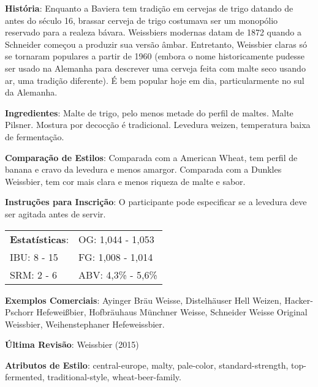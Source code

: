 \textbf{História}: Enquanto a Baviera tem tradição em cervejas de trigo datando de antes do século 16, brassar cerveja de trigo costumava ser um monopólio reservado para a realeza bávara. Weissbiers modernas datam de 1872 quando a Schneider começou a produzir sua versão âmbar. Entretanto, Weissbier claras só se tornaram populares a partir de 1960 (embora o nome historicamente pudesse ser usado na Alemanha para descrever uma cerveja feita com malte seco usando ar, uma tradição diferente). É bem popular hoje em dia, particularmente no sul da Alemanha.

\textbf{Ingredientes}: Malte de trigo, pelo menos metade do perfil de maltes. Malte Pilsner. Mostura por decocção é tradicional. Levedura weizen, temperatura baixa de fermentação.

\textbf{Comparação de Estilos}: Comparada com a American Wheat, tem perfil de banana e cravo da levedura e menos amargor. Comparada com a Dunkles Weissbier, tem cor mais clara e menos riqueza de malte e sabor.

\textbf{Instruções para Inscrição}: O participante pode especificar se a levedura deve ser agitada antes de servir.

\begin{tabular}{@{}p{35mm}p{35mm}@{}}
  \textbf{Estatísticas}: & OG: 1,044 - 1,053 \\
  IBU: 8 - 15 & FG: 1,008 - 1,014 \\
  SRM: 2 - 6 & ABV: 4,3\% - 5,6\%
\end{tabular}

\textbf{Exemplos Comerciais}: Ayinger Bräu Weisse, Distelhäuser Hell Weizen, Hacker-Pschorr Hefeweißbier, Hofbräuhaus Münchner Weisse, Schneider Weisse Original Weissbier, Weihenstephaner Hefeweissbier.

\textbf{Última Revisão}: Weissbier (2015)

\textbf{Atributos de Estilo}: central-europe, malty, pale-color, standard-strength, top-fermented, traditional-style, wheat-beer-family.
